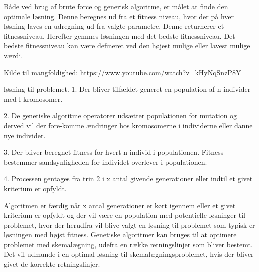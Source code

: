 Både ved brug af brute force og generisk algoritme, er målet at finde den optimale løsning. Denne beregnes ud fra et fitness niveau, hvor der på hver løsning laves en udregning ud fra valgte parametre. Denne returnerer et fitnessniveau. Herefter gemmes løsningen med det bedste fitnessniveau. Det bedste fitnessniveau kan være defineret ved den højest mulige eller lavest mulige værdi.  
 
Kilde til mangfoldighed: https://www.youtube.com/watch?v=kHyNqSnzP8Y 

løsning til problemet.
1.	Der bliver tilfældet generet en population af n-individer med l-kromosomer.

2.	De genetiske algoritme operatorer udsætter populationen for mutation og derved vil der fore-komme ændringer hos kromosomerne i individerne eller danne nye individer.

3.	Der bliver beregnet fitness for hvert n-individ i populationen. Fitness bestemmer sandsynligheden for individet overlever i populationen.

4.	Processen gentages fra trin 2 i x antal givende generationer eller indtil et givet kriterium er opfyldt.

Algoritmen er færdig når x antal generationer er kørt igennem eller et givet kriterium er opfyldt og der vil være en population med potentielle løsninger til problemet, hvor der herudfra vil blive valgt en løsning til problemet som typisk er løsningen med højst fitness. Genetiske algoritmer kan bruges til at optimere problemet med skemalægning, udefra en række retningslinjer som bliver bestemt. Det vil udmunde i en optimal løsning til skemalægningsproblemet, hvis der bliver givet de korrekte retningslinjer.
